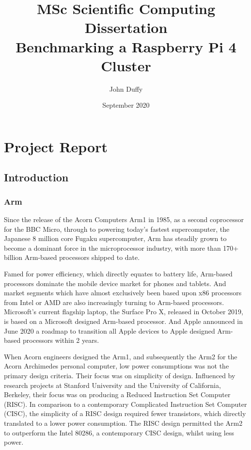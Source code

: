 \documentclass{report}
\title{MSc Scientific Computing Dissertation\\Benchmarking a Raspberry Pi 4 Cluster}
\author{John Duffy}
\date{September 2020}
\begin{document}
\maketitle

\tableofcontents


%
%
\part{Project Report}


%
%
\chapter{Introduction}


%
%
\section{Arm}

Since the release of the Acorn Computers Arm1 in 1985, as a second coprocessor for the BBC Micro, through to powering today's fastest supercomputer, the Japanese 8 million core Fugaku supercomputer, Arm has steadily grown to become a dominant force in the microprocessor industry, with more than 170+ billion Arm-based processors shipped to date.

Famed for power efficiency, which directly equates to battery life, Arm-based processors dominate the mobile device market for phones and tablets. And market segments which have almost exclusively been based upon x86 processors from Intel or AMD are also increasingly turning to Arm-based processors. Microsoft's current flagship laptop, the Surface Pro X, released in October 2019, is based on a Microsoft designed Arm-based processor. And Apple announced in June 2020 a roadmap to transition all Apple devices to Apple designed Arm-based processors within 2 years.

When Acorn engineers designed the Arm1, and subsequently the Arm2 for the Acorn Archimedes personal computer, low power consumptions was not the primary design criteria. Their focus was on simplicity of design. Influenced by research projects at Stanford University and the University of California, Berkeley, their focus was on producing a Reduced Instruction Set Computer (RISC). In comparison to a contemporary Complicated Instruction Set Computer (CISC), the simplicity of a RISC design required fewer transistors, which directly translated to a lower power consumption. The RISC design permitted the Arm2 to outperform the Intel 80286, a contemporary CISC design, whilst using less power. 
\end{document}

